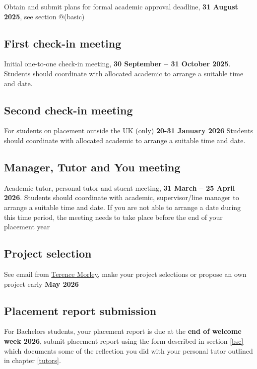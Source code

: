 \documentclass[
]{book}
\begin{document}
Obtain and submit plans for formal academic approval deadline, \textbf{31 August 2025}, see section @(basic)

\subsection{First check-in meeting}\label{one}

Initial one-to-one check-in meeting, \textbf{30 September -- 31 October 2025}. Students should coordinate with allocated academic to arrange a suitable time and date.

\subsection{Second check-in meeting}\label{two}

For students on placement outside the UK (only) \textbf{20-31 January 2026} Students should coordinate with allocated academic to arrange a suitable time and date.

\subsection{Manager, Tutor and You meeting}\label{three}

Academic tutor, personal tutor and stuent meeting, \textbf{31 March -- 25 April 2026}. Students should coordinate with academic, supervisor/line manager to arrange a suitable time and date. If you are not able to arrange a date during this time period, the meeting needs to take place before the end of your placement year

\subsection{Project selection}\label{four}

See email from \href{https://research.manchester.ac.uk/en/persons/terence.morley}{Terence Morley}, make your project selections or propose an own project early \textbf{May 2026}

\subsection{Placement report submission}\label{five}

For Bachelors students, your placement report is due at the \textbf{end of welcome week 2026}, submit placement report using the form described in section \ref{bsc} which documents some of the reflection you did with your personal tutor outlined in chapter \ref{tutors}.
\end{document}
